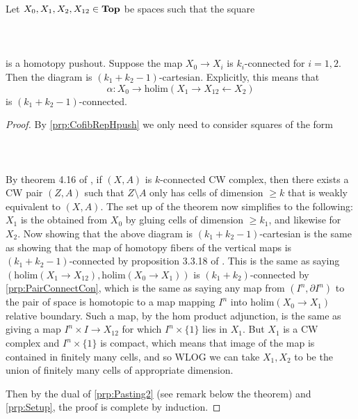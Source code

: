 \begin{thm}\label{thm:BMT} Let $X_0,X_1,X_2,X_{12}\in\bold{Top}$ be spaces such that the square  
 \\~\\  \\~\\
is a homotopy pushout. Suppose the map $X_0\to X_i$ is $k_i$-connected for $i=1,2$. Then the diagram is $(k_1+k_2-1)$-cartesian. Explicitly, this means that $$\alpha:X_0\to\text{holim}(X_1\rightarrow X_{12}\leftarrow X_2)$$ is $(k_1+k_2-1)$-connected. 
\begin{proof}
By \ref{prp:CofibRepHpush} we only need to consider squares of the form  
 \\~\\  \\~\\
By theorem 4.16 of \cite{AT}, if $(X,A)$ is $k$-connected CW complex, then there exists a CW pair $(Z,A)$ such that $Z\setminus A$ only has cells of dimension $\geq k$ that is weakly equivalent to $(X,A)$. The set up of the theorem now simplifies to the following: $X_1$ is the obtained from $X_0$ by gluing cells of dimension $\geq k_1$, and likewise for $X_2$. Now showing that the above diagram is $(k_1+k_2-1)$-cartesian is the same as showing that the map of homotopy fibers of the vertical maps is $(k_1+k_2-1)$-connected by proposition 3.3.18 of \cite{CHT}. This is the same as saying $(\text{holim}(X_1\to X_{12}),\text{holim}(X_0\to X_1))$ is $(k_1+k_2)$-connected by \ref{prp:PairConnectCon}, which is the same as saying any map from $(I^n,\partial I^n)$ to the pair of space is homotopic to a map mapping $I^n$ into $\text{holim}(X_0\to X_1)$ relative boundary. Such a map, by the hom product adjunction, is the same as giving a map $I^n\times I\to X_{12}$ for which $I^n\times\{1\}$ lies in $X_1$. But $X_1$ is a CW complex and $I^n\times\{1\}$ is compact, which means that image of the map is contained in finitely many cells, and so WLOG we can take $X_1,X_2$ to be the union of finitely many cells of appropriate dimension. 

Then by the dual of \ref{prp:Pasting2} (see remark below the theorem) and \ref{prp:Setup}, the proof is complete by induction. 
\end{proof}
\end{thm}

